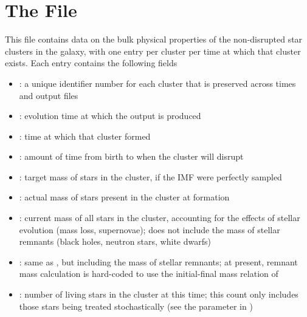 \documentclass[letterpaper,10pt,english]{sphinxmanual}
\begin{document}
\section{The  File}
\label{\detokenize{output:the-cluster-prop-file}}
This file contains data on the bulk physical properties of the non-disrupted star clusters in the galaxy, with one entry per cluster per time at which that cluster exists. Each entry contains the following fields
\begin{itemize}
\item {} 
: a unique identifier number for each cluster that is preserved across times and output files

\item {} 
: evolution time at which the output is produced

\item {} 
: time at which that cluster formed

\item {} 
: amount of time from birth to when the cluster will disrupt

\item {} 
: target mass of stars in the cluster, if the IMF were perfectly sampled

\item {} 
: actual mass of stars present in the cluster at formation

\item {} 
: current mass of all stars in the cluster, accounting for the effects of stellar evolution (mass loss, supernovae); does not include the mass of stellar remnants (black holes, neutron stars, white dwarfs)

\item {} 
: same as , but including the mass of stellar remnants; at present, remnant mass calculation is hard-coded to use the initial-final mass relation of 

\item {} 
: number of living stars in the cluster at this time; this count only includes those stars being treated stochastically (see the parameter  in {\hyperref[\detokenize{parameters:ssec-stellar-keywords}]{}})


\end{itemize}
\end{document}
